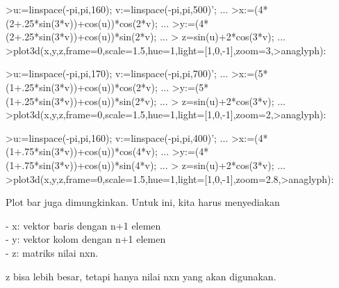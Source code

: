 \documentclass[a4paper,10pt]{article}
\begin{document}
\begin{eulernotebook}
\begin{eulercomment}
\begin{eulercomment}
\begin{eulerprompt}
>u:=linspace(-pi,pi,160); v:=linspace(-pi,pi,500)';  ...
>x:=(4*(2+.25*sin(3*v))+cos(u))*cos(2*v); ...
>y:=(4*(2+.25*sin(3*v))+cos(u))*sin(2*v); ...
> z=sin(u)+2*cos(3*v); ...
>plot3d(x,y,z,frame=0,scale=1.5,hue=1,light=[1,0,-1],zoom=3,>anaglyph):
\end{eulerprompt}
\begin{eulerprompt}
>u:=linspace(-pi,pi,170); v:=linspace(-pi,pi,700)';  ...
>x:=(5*(1+.25*sin(3*v))+cos(u))*cos(2*v); ...
>y:=(5*(1+.25*sin(3*v))+cos(u))*sin(2*v); ...
> z=sin(u)+2*cos(3*v); ...
>plot3d(x,y,z,frame=0,scale=1.5,hue=1,light=[1,0,-1],zoom=2,>anaglyph):
\end{eulerprompt}
\begin{eulerprompt}
>u:=linspace(-pi,pi,160); v:=linspace(-pi,pi,400)';  ...
>x:=(4*(1+.75*sin(3*v))+cos(u))*cos(4*v); ...
>y:=(4*(1+.75*sin(3*v))+cos(u))*sin(4*v); ...
> z=sin(u)+2*cos(3*v); ...
>plot3d(x,y,z,frame=0,scale=1.5,hue=1,light=[1,0,-1],zoom=2.8,>anaglyph):
\end{eulerprompt}
\begin{eulercomment}
Plot bar juga dimungkinkan. Untuk ini, kita harus menyediakan

- x: vektor baris dengan n+1 elemen\\
- y: vektor kolom dengan n+1 elemen\\
- z: matriks nilai nxn.

z bisa lebih besar, tetapi hanya nilai nxn yang akan digunakan.


\end{eulercomment}
\end{eulercomment}
\end{eulercomment}
\end{eulernotebook}
\end{document}
